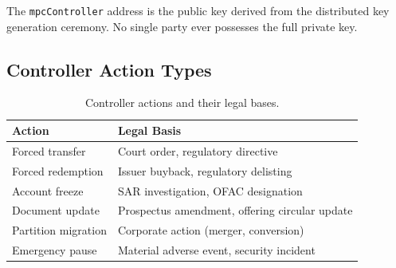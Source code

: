 The \texttt{mpcController} address is the public key derived from the distributed key generation ceremony. No single party ever possesses the full private key.

\subsection{Controller Action Types}

\begin{table}[H]
\centering
\caption{Controller actions and their legal bases.}
\label{tab:controller-actions}
\begin{tabular}{lp{6.5cm}}
\toprule
\textbf{Action} & \textbf{Legal Basis} \\
\midrule
Forced transfer & Court order, regulatory directive \\
Forced redemption & Issuer buyback, regulatory delisting \\
Account freeze & SAR investigation, OFAC designation \\
Document update & Prospectus amendment, offering circular update \\
Partition migration & Corporate action (merger, conversion) \\
Emergency pause & Material adverse event, security incident \\
\bottomrule
\end{tabular}
\end{table}

